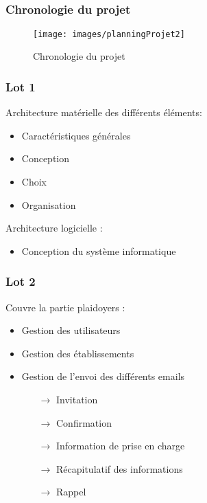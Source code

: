
\speaker{\Mathieu}
\subsection{} %


\begin{frame}
	\frametitle{Chronologie du projet}
	\begin{figure}
		\begin{landscape}
		\texttt{[image: images/planningProjet2]}
		\end{landscape}
        \caption{Chronologie du projet}
	\end{figure} 
\end{frame}




\begin{frame}
	\frametitle{Lot 1}
	Architecture matérielle des différents éléments:
		\begin{itemize}
		\item Caractéristiques générales
		\item Conception
		\item Choix		
		\item Organisation
	\end{itemize}
	Architecture logicielle :
		\begin{itemize}
		\item Conception du système informatique
	\end{itemize}
\end{frame}


\speaker{\Michel}
\begin{frame}
	\frametitle{Lot 2}
	Couvre la partie plaidoyers :
	\begin{itemize}
		\item Gestion des utilisateurs
		\item Gestion des établissements
		\item Gestion de l'envoi des différents emails 
		\begin{itemize}
			\item [$\rightarrow$] Invitation
			\item [$\rightarrow$] Confirmation
			\item [$\rightarrow$] Information de prise en charge
			\item [$\rightarrow$] Récapitulatif des informations
			\item [$\rightarrow$] Rappel
		\end{itemize}
	\end{itemize}
\end{frame}

